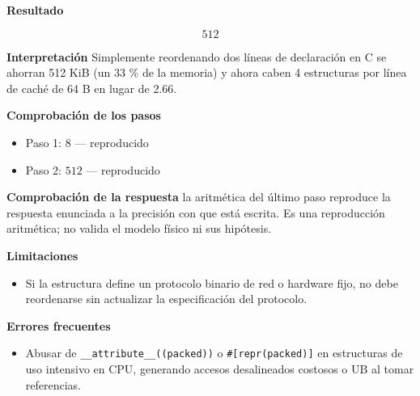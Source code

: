 \documentclass{book}
\begin{document}
\begin{tcolorbox}[title={Problema resuelto}, studiumworked, breakable]
\noindent\textbf{Resultado}

\[
512
\]

\noindent\textbf{Interpretación}
Simplemente reordenando dos líneas de declaración en C se ahorran 512 KiB (un 33 \% de la memoria) y ahora caben 4 estructuras por línea de caché de 64 B en lugar de 2.66.

\noindent\textbf{Comprobación de los pasos}
\begin{itemize}
\item Paso 1: $8$ — reproducido
\item Paso 2: $512$ — reproducido
\end{itemize}

\noindent\textbf{Comprobación de la respuesta} la aritmética del último paso reproduce la respuesta enunciada a la precisión con que está escrita. Es una reproducción aritmética; no valida el modelo físico ni sus hipótesis.

\noindent\textbf{Limitaciones}
\begin{itemize}
\item Si la estructura define un protocolo binario de red o hardware fijo, no debe reordenarse sin actualizar la especificación del protocolo.
\end{itemize}

\noindent\textbf{Errores frecuentes}
\begin{itemize}
\item Abusar de \texttt{\_\_attribute\_\_((packed))} o \texttt{\#[repr(packed)]} en estructuras de uso intensivo en CPU, generando accesos desalineados costosos o UB al tomar referencias.
\end{itemize}
\end{tcolorbox}
\end{document}
